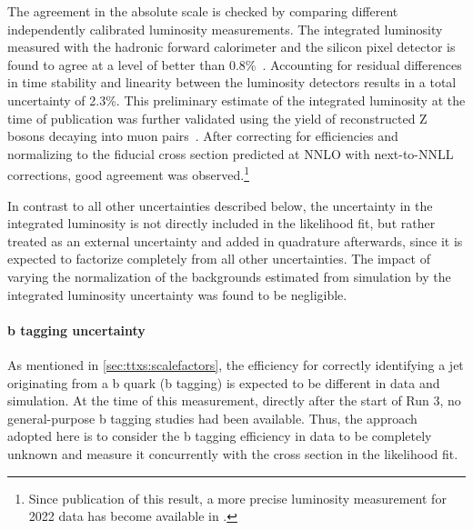 The agreement in the absolute scale is checked by comparing different independently calibrated luminosity measurements. The integrated luminosity measured with the hadronic forward calorimeter and the silicon pixel detector is found to agree at a level of better than 0.8\%~\cite{CMS:TOP-22-012}. 
Accounting for residual differences in time stability and linearity between the luminosity detectors results in a total uncertainty of 2.3\%. This preliminary estimate of the integrated luminosity at the time of publication was further validated using the yield of reconstructed Z bosons decaying into muon pairs~\cite{CMS:DP-2023-003}. After correcting for efficiencies and normalizing to the fiducial cross section predicted at NNLO with next-to-NNLL corrections, good agreement was observed.\footnote{Since publication of this result, a more precise luminosity measurement for 2022 data has become available in .}

In contrast to all other uncertainties described below, the uncertainty in the integrated luminosity is not directly included in the likelihood fit, but rather treated as an external uncertainty and added in quadrature afterwards, since it is expected to factorize completely from all other uncertainties.
The impact of varying the normalization of the backgrounds estimated from simulation by the integrated luminosity uncertainty was found to be negligible.

\paragraph{b tagging uncertainty}

As mentioned in \cref{sec:ttxs:scalefactors}, the efficiency for correctly identifying a jet originating from a b quark (b tagging) is expected to be different in data and simulation. At the time of this measurement, directly after the start of Run 3, no general-purpose b tagging studies had been available. Thus, the approach adopted here is to consider the b tagging efficiency in data to be completely unknown and measure it concurrently with the cross section in the likelihood fit.

